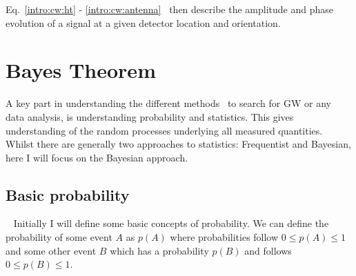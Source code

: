 Eq.~\ref{intro:cw:ht} - \ref{intro:cw:antenna}~ then describe the amplitude and phase evolution of a
signal at a given detector location and orientation.



\section{\label{intro:prob} Bayes Theorem}

A key part in understanding the different methods~ to search for
\gls{GW} or any~ data analysis, is understanding probability
and statistics.  This gives~ understanding of the random processes
underlying all measured quantities.  Whilst there are generally two approaches
to statistics: Frequentist and Bayesian, here I will focus on the Bayesian
approach.  

\subsection{\label{intro:prob:basic}Basic probability}

~
Initially I will define some basic concepts of probability.  We can define the
probability of some event $A$ as $p(A)$ where probabilities follow $0 \leq p(A)
\leq 1$ and some other event $B$ which has a probability $p(B)$ and
follows~ $0 \leq p(B) \leq 1$.

